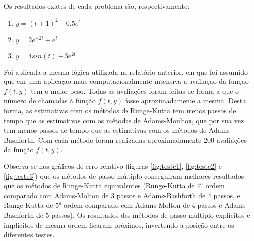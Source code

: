 \documentclass[final,5p]{elsarticle}
\numberwithin{equation}{section}
\begin{document}
        Os resultados exatos de cada problema são, respectivamente:

        \begin{enumerate}
            \item $y = (t+1)^2 - 0.5 e^t$
            \item $y = 2 e^{-2 t} + e^t$
            \item $y = 4 sin(t) + 3 e^{2 t}$
        \end{enumerate}

        Foi aplicada a mesma lógica utilizada no relatório anterior, em que foi assumido que em uma aplicação mais computacionalmente intensiva a avaliação da função $f(t,y)$ tem o maior peso. Todas as avaliações foram feitas de forma a que o número de chamadas à função $f(t,y)$ fosse aproximadamente a mesma. Desta forma, as estimativas com os métodos de Runge-Kutta tem menos passos de tempo que as estimativas com os métodos de Adams-Moulton, que por sua vez tem menos passos de tempo que as estimativas com os métodos de Adams-Bashforth. Com cada método foram realizadas aproximadamente 200 avaliações da função $f(t,y)$.

        Observa-se nos gráficos de erro relativo (figuras \ref{fig:teste1}, \ref{fig:teste2} e \ref{fig:teste3}) que os métodos de passo múltiplo conseguiram melhores resultados que os métodos de Runge-Kutta equivalentes (Runge-Kutta de $4^a$ ordem comparado com Adams-Molton de 3 passos e Adams-Bashforth de 4 passos, e Runge-Kutta de $5^a$ ordem comparado com Adams-Molton de 4 passos e Adams-Bashforth de 5 passos). Os resultados dos métodos de passo múltiplo explícitos e implicitos de mesma ordem ficaram próximos, invertendo a posição entre os diferentes testes.
\end{document}
